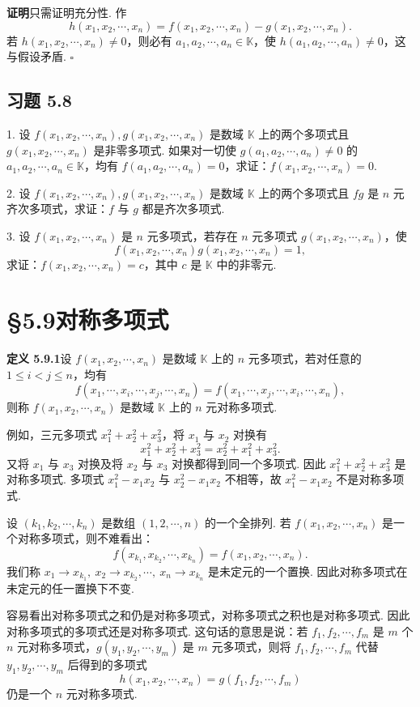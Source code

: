 \documentclass[UTF8,12pt,a4paper,fontset=fandol]{ctexart}
\begin{document}
\noindent\textbf{证明}\quad 只需证明充分性. 作
\[
h(x_1,x_2,\cdots,x_n)=f(x_1,x_2,\cdots,x_n)-g(x_1,x_2,\cdots,x_n).
\]
若 $h(x_1,x_2,\cdots,x_n)\neq 0$，则必有 $a_1,a_2,\cdots,a_n\in\mathbb{K}$，使 $h(a_1,a_2,\cdots,a_n)\neq 0$，这与假设矛盾. $\square$

\subsection*{习题 5.8}

1. 设 $f(x_1,x_2,\cdots,x_n),g(x_1,x_2,\cdots,x_n)$ 是数域 $\mathbb{K}$ 上的两个多项式且 $g(x_1,x_2,\cdots,x_n)$ 是非零多项式. 如果对一切使 $g(a_1,a_2,\cdots,a_n)\neq 0$ 的 $a_1,a_2,\cdots,a_n\in\mathbb{K}$，均有 $f(a_1,a_2,\cdots,a_n)=0$，求证：$f(x_1,x_2,\cdots,x_n)=0$.

2. 设 $f(x_1,x_2,\cdots,x_n),g(x_1,x_2,\cdots,x_n)$ 是数域 $\mathbb{K}$ 上的两个多项式且 $fg$ 是 $n$ 元齐次多项式，求证：$f$ 与 $g$ 都是齐次多项式.

3. 设 $f(x_1,x_2,\cdots,x_n)$ 是 $n$ 元多项式，若存在 $n$ 元多项式 $g(x_1,x_2,\cdots,x_n)$，使
\[
f(x_1,x_2,\cdots,x_n)g(x_1,x_2,\cdots,x_n)=1,
\]
求证：$f(x_1,x_2,\cdots,x_n)=c$，其中 $c$ 是 $\mathbb{K}$ 中的非零元.

\section*{§5.9\quad 对称多项式}

\noindent\textbf{定义 5.9.1}\quad 设 $f(x_1,x_2,\cdots,x_n)$ 是数域 $\mathbb{K}$ 上的 $n$ 元多项式，若对任意的 $1\leq i<j\leq n$，均有
\[
f(x_1,\cdots,x_i,\cdots,x_j,\cdots,x_n)=f(x_1,\cdots,x_j,\cdots,x_i,\cdots,x_n),
\]
则称 $f(x_1,x_2,\cdots,x_n)$ 是数域 $\mathbb{K}$ 上的 $n$ 元对称多项式.

例如，三元多项式 $x_1^2+x_2^2+x_3^2$，将 $x_1$ 与 $x_2$ 对换有
\[
x_1^2+x_2^2+x_3^2=x_2^2+x_1^2+x_3^2.
\]
又将 $x_1$ 与 $x_3$ 对换及将 $x_2$ 与 $x_3$ 对换都得到同一个多项式. 因此 $x_1^2+x_2^2+x_3^2$ 是对称多项式. 多项式 $x_1^2-x_1x_2$ 与 $x_2^2-x_1x_2$ 不相等，故 $x_1^2-x_1x_2$ 不是对称多项式.

设 $(k_1,k_2,\cdots,k_n)$ 是数组 $(1,2,\cdots,n)$ 的一个全排列. 若 $f(x_1,x_2,\cdots,x_n)$ 是一个对称多项式，则不难看出：
\[
f(x_{k_1},x_{k_2},\cdots,x_{k_n})=f(x_1,x_2,\cdots,x_n).
\]
我们称 $x_1\to x_{k_1},\ x_2\to x_{k_2},\cdots,\ x_n\to x_{k_n}$ 是未定元的一个置换. 因此对称多项式在未定元的任一置换下不变.

容易看出对称多项式之和仍是对称多项式，对称多项式之积也是对称多项式. 因此对称多项式的多项式还是对称多项式. 这句话的意思是说：若 $f_1,f_2,\cdots,f_m$ 是 $m$ 个 $n$ 元对称多项式，$g(y_1,y_2,\cdots,y_m)$ 是 $m$ 元多项式，则将 $f_1,f_2,\cdots,f_m$ 代替 $y_1,y_2,\cdots,y_m$ 后得到的多项式
\[
h(x_1,x_2,\cdots,x_n)=g(f_1,f_2,\cdots,f_m)
\]
仍是一个 $n$ 元对称多项式.
\end{document}
